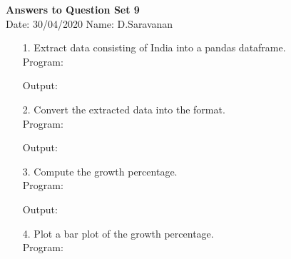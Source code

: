 \documentclass[a4paper,11pt,openright]{report}
\begin{document}
\singlespacing
\pagestyle{plain}

\begin{center}
\textbf{Answers to Question Set 9} \\
Date: 30/04/2020 \hspace{2mm} Name: D.Saravanan
\end{center}

\vspace{10px}

\begin{enumerate}

\item[1.] Extract data consisting of India into a pandas dataframe. \\

Program:


\vspace{5px}

Output:


\vspace{10px}

\item[2.] Convert the extracted data into the format. \\

Program:


\vspace{5px}

Output:


\vspace{10px}

\item[3.] Compute the growth percentage. \\

Program:


\vspace{5px}

Output:


\vspace{10px}

\item[4.] Plot a bar plot of the growth percentage. \\

Program: 


\vspace{5px}


\end{enumerate}
\end{document}
